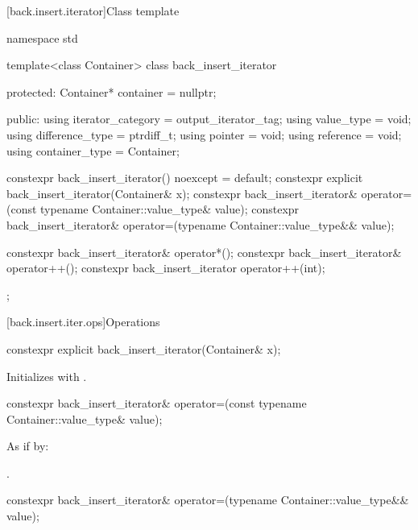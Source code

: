 [back.insert.iterator]{Class template }

%
\begin{codeblock}
namespace std {
  template<class Container>
  class back_insert_iterator {
  protected:
    Container* container = nullptr;

  public:
    using iterator_category = output_iterator_tag;
    using value_type        = void;
    using difference_type   = ptrdiff_t;
    using pointer           = void;
    using reference         = void;
    using container_type    = Container;

    constexpr back_insert_iterator() noexcept = default;
    constexpr explicit back_insert_iterator(Container& x);
    constexpr back_insert_iterator& operator=(const typename Container::value_type& value);
    constexpr back_insert_iterator& operator=(typename Container::value_type&& value);

    constexpr back_insert_iterator& operator*();
    constexpr back_insert_iterator& operator++();
    constexpr back_insert_iterator  operator++(int);
  };
}
\end{codeblock}

[back.insert.iter.ops]{Operations}

%
\begin{itemdecl}
constexpr explicit back_insert_iterator(Container& x);
\end{itemdecl}

\begin{itemdescr}
\pnum
\effects
Initializes
with .
\end{itemdescr}

%
\begin{itemdecl}
constexpr back_insert_iterator& operator=(const typename Container::value_type& value);
\end{itemdecl}

\begin{itemdescr}
\pnum
\effects
As if by: 

\pnum
\returns
{}.
\end{itemdescr}

%
\begin{itemdecl}
constexpr back_insert_iterator& operator=(typename Container::value_type&& value);
\end{itemdecl}

